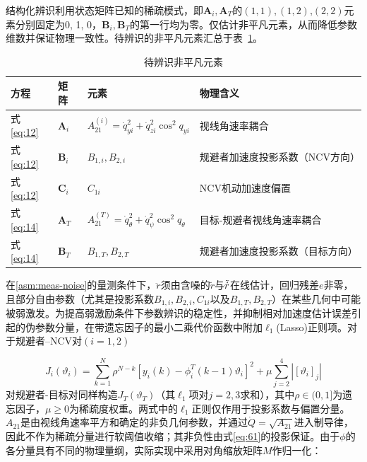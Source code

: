 结构化辨识利用状态矩阵已知的稀疏模式，即${{\mathbf{A}}_i},{{\mathbf{A}}_T}$的$(1,1),(1,2){\text{,}}(2,2)$元素分别固定为0, 1, 0，${{\mathbf{B}}_i},{{\mathbf{B}}_T}$的第一行均为零。仅估计非平凡元素，从而降低参数维数并保证物理一致性。待辨识的非平凡元素汇总于表~\ref{tab:nontrivial}。

\begin{table}[htbp]
\centering
\caption{待辨识非平凡元素}
\label{tab:nontrivial}
\small
\begin{tabularx}{\linewidth}{lXXX}
\toprule
方程 & 矩阵 & 元素 & 物理含义 \\
\midrule
式\eqref{eq:12} & ${{\mathbf{A}}_i}$ & $A_{21}^{(i)} = \dot q_{yi}^2 + \dot q_{zi}^2{\cos ^2}{q_{yi}}$ & 视线角速率耦合 \\
式\eqref{eq:12} & ${{\mathbf{B}}_i}$ & ${B_{1,i}},{B_{2,i}}$ & 规避者加速度投影系数（NCV方向） \\
式\eqref{eq:12} & ${{\mathbf{C}}_i}$ & ${C_{1i}}$ & NCV机动加速度偏置 \\
式\eqref{eq:14} & ${{\mathbf{A}}_T}$ & $A_{21}^{(T)} = \dot q_\theta ^2 + \dot q_\psi ^2{\cos ^2}{q_\theta }$ & 目标-规避者视线角速率耦合 \\
式\eqref{eq:14} & ${{\mathbf{B}}_T}$ & ${B_{1,T}},{B_{2,T}}$ & 规避者加速度投影系数（目标方向） \\
\bottomrule
\end{tabularx}
\end{table}
\FloatBarrier

在\cref{asm:meas-noise}的量测条件下，$\ddot r$须由含噪的$\tilde{r}$与$\tilde{\dot{r}}$在线估计，回归残差$e$非零，且部分自由参数（尤其是投影系数${B_{1,i}},{B_{2,i}},{C_{1i}}$以及${B_{1,T}},{B_{2,T}}$）在某些几何中可能被弱激发。为提高弱激励条件下参数辨识的稳定性，并抑制相对加速度估计误差引起的伪参数分量，在带遗忘因子的最小二乘代价函数\cite{ljung1999}中附加${\ell _1}$(Lasso)正则项。对于规避者–NCV对$(i = 1,2)$

\begin{equation}
\label{eq:55}
{J_i}({\vartheta _i}) = \sum\limits_{k = 1}^N {{\rho ^{N - k}}} {\left[ {{y_i}(k) - \phi _i^T(k - 1){\vartheta _i}} \right]^2} + \mu \sum\limits_{j = 2}^4 {\left| {{[{\vartheta _i}]}_j} \right|}
\end{equation}
对规避者-目标对同样构造${J_T}({\vartheta _T})$（其${\ell _1}$项对$j = 2,3$求和），其中$\rho  \in (0,1]$为遗忘因子，$\mu  \geqslant 0$为稀疏度权重。两式中的${\ell _1}$正则仅作用于投影系数与偏置分量。${A_{21}}$是由视线角速率平方和确定的非负几何参数，并通过$\dot Q=\sqrt{A_{21}}$进入制导律，因此不作为稀疏分量进行软阈值收缩；其非负性由式\eqref{eq:61}的投影保证。由于$\phi $的各分量具有不同的物理量纲，实际实现中采用对角缩放矩阵$M$作归一化：

